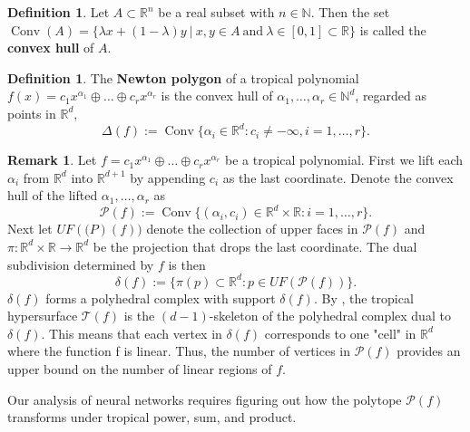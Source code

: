 \documentclass{article}
\theoremstyle{definition}
\newtheorem{definition}[theorem]{Definition}
\newtheorem{remark}[theorem]{Remark}
\DeclareMathOperator{\Conv}{Conv}
\begin{document}
\begin{definition}
Let $A \subset \mathbb{R}^{n}$ be a real subset with $n \in \mathbb{N}$. Then the set $\Conv(A) = \{\lambda x + (1- \lambda)y \ | \ x, y \in A \ \text{and} \ \lambda \in [0,1] \subset \mathbb{R}\}$ is called the \textbf{convex hull} of $A$.
\end{definition}

\begin{definition}\hspace{1sp}\cite[p.~3]{zhang2018tropical}
The \textbf{Newton polygon} of a tropical polynomial $f(x) = c_1 x^{\alpha_1} \oplus \dots \oplus c_r x^{\alpha_r}$  is the convex hull of $\alpha_1 , \dots , \alpha_r \in \mathbb{N}^{d}$, regarded as points in $\mathbb{R}^{d}$,
$$ \Delta(f) := \Conv\{\alpha_i \in \mathbb{R}^{d} : c_i \neq -\infty , i = 1, \dots ,r \}. $$
\end{definition}

\begin{remark}\hspace{1sp}\cite[p.~3]{zhang2018tropical}
\label{rem:subdivision}
Let $f = c_1 x^{\alpha_1} \oplus \dots \oplus c_r x^{\alpha_r}$ be a tropical polynomial. First we lift each $\alpha_i$ from $\mathbb{R}^d$ into $\mathbb{R}^{d+1}$ by appending $c_i$ as the last coordinate. Denote the convex hull of the lifted $\alpha_1, \dots , \alpha_r$ as
$$\mathcal{P}(f):= \Conv\{(\alpha_i, c_i) \in \mathbb{R}^{d} \times \mathbb{R} : i = 1, \dots , r\}.$$
Next let $UF(\mathcal(P)(f))$ denote the collection of upper faces in $\mathcal{P}(f)$ and $\pi : \mathbb{R}^{d} \times \mathbb{R} \to \mathbb{R}^{d}$ be the projection that drops
the last coordinate. The dual subdivision determined by $f$
is then
$$\delta(f) := \{\pi(p) \subset \mathbb{R}^{d} : p \in UF( \mathcal{P}(f))\}.$$
$\delta (f)$ forms a polyhedral complex with support $\delta (f)$. By \cite[Proposition 3.1.6.]{maclagan2015introduction}, the tropical hypersurface $\mathcal{T}(f)$ is the $(d - 1)$-skeleton of the polyhedral complex dual to $ \delta(f)$. This means that each vertex in $ \delta(f)$ corresponds to one "cell" in $\mathbb{R}^{d}$ where the function f is linear. Thus, the number of vertices in $\mathcal{P}(f)$ provides an upper bound on the number of linear regions of $f$.
\end{remark}

Our analysis of neural networks requires figuring out how the polytope $\mathcal{P}(f)$ transforms under tropical power, sum, and product.
\end{document}
